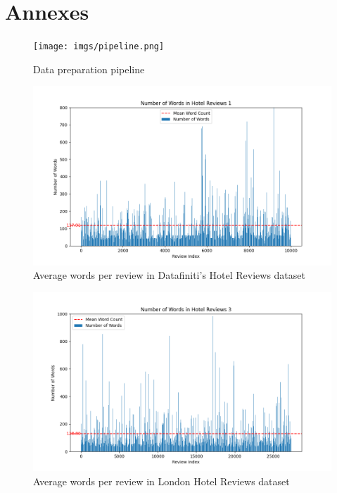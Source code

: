\documentclass[sigconf]{acmart}
\begin{document}
\nocite{*}
\def\BibTex{BibTeX}


\appendix

\section{Annexes}

\begin{figure}[H]
  \centering
  \texttt{[image: imgs/pipeline.png]}
  \caption{Data preparation pipeline}
  \label{fig:pipeline}
\end{figure}

\begin{figure}[h]
  \centering
  \includegraphics[width=\linewidth]{imgs/word_count_1.png}
  \caption{Average words per review in Datafiniti's Hotel Reviews dataset}
  \label{fig:reviewWords1}
\end{figure}

\begin{figure}[H]
  \centering
  \includegraphics[width=\linewidth]{imgs/word_count_3.png}
  \caption{Average words per review in London Hotel Reviews dataset}
  \label{fig:reviewWords3}
\end{figure}
\end{document}
